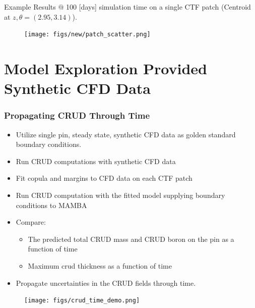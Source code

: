 \documentclass[t, pdftex]{beamer}
\begin{document}
\begin{frame}
\tiny Example Results $@$ 100 [days] simulation time on a single CTF patch (Centroid at $z,\theta=(2.95, 3.14)$). 
\begin{figure}[!htbp]
\centering
\texttt{[image: figs/new/patch\_scatter.png]}
\label{model_overview}
\end{figure}
\end{frame}

\section[Model Exploration]{Model Exploration Provided Synthetic CFD Data}
\begin{frame}[shrink=2]
\frametitle{Propagating CRUD Through Time}
\begin{itemize}
\item Utilize single pin, steady state, synthetic CFD data as golden standard boundary conditions.
\item Run CRUD computations with synthetic CFD data 
\item Fit copula and margins to CFD data on each CTF patch 
\item Run CRUD computation with the fitted model supplying boundary conditions to MAMBA
\item Compare:
\begin{itemize}
\item The predicted total CRUD mass and CRUD boron on the pin as a function of time
\item Maximum crud thickness as a function of time
\end{itemize}
\item Propagate uncertainties in the CRUD fields through time.
\end{itemize}
\begin{figure}[!htbp]
\centering
\texttt{[image: figs/crud\_time\_demo.png]}
\label{model_overview}
\end{figure}
\end{frame}
\end{document}
